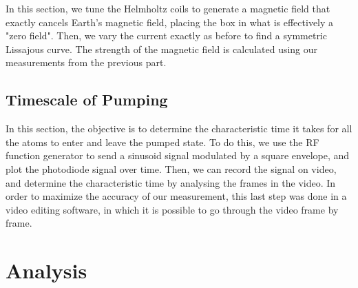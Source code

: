 \documentclass[10pt]{article}
\begin{document}
	In this section, we tune the Helmholtz coils to generate a magnetic field that
	exactly cancels Earth's magnetic field, placing the box in what is effectively a
	"zero field". Then, we vary the current exactly as before to find a symmetric
	Lissajous curve. The strength of the magnetic field is calculated using our
	measurements from the previous part.   

	\subsection{Timescale of Pumping} 
	In this section, the objective is to determine the characteristic time it takes
	for all the atoms to enter and leave the pumped state. To do this, we use the RF
	function generator to send a sinusoid signal modulated by a square envelope, and
	plot the photodiode signal over time. Then, we can record the signal on video,
	and determine the characteristic time by analysing the frames in the video. In
	order to maximize the accuracy of our measurement, this last step was done in a
	video editing software, in which it is possible to go through the video frame by
	frame. 

	\section{Analysis}
\end{document}
